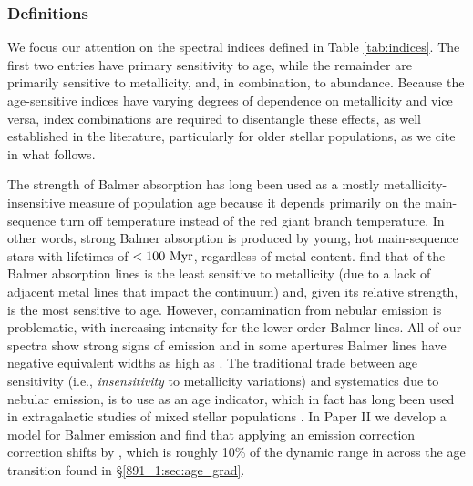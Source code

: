 \subsubsection{Definitions}
\label{891_1:sec:index_defn}

We focus our attention on the spectral indices defined in Table
\ref{tab:indices}. The first two entries have primary sensitivity to
age, while the remainder are primarily sensitive to metallicity, and,
in combination, to abundance. Because the age-sensitive indices have
varying degrees of dependence on metallicity and vice versa, index
combinations are required to disentangle these effects, as well
established in the literature, particularly for older stellar
populations, as we cite in what follows.

The strength of Balmer absorption has long been used as a mostly
metallicity-insensitive measure of population age because it depends
primarily on the main-sequence turn off temperature instead of the red
giant branch temperature. In other words, strong Balmer absorption is
produced by young, hot main-sequence stars with lifetimes of
$<100~\mathrm{Myr} $, regardless of metal content. \citet{Worthey97} find
that of the Balmer absorption lines \HB is the least sensitive to
metallicity (due to a lack of adjacent metal lines that impact the
continuum) and, given its relative strength, is the most sensitive to
age.  However, contamination from nebular emission is problematic,
with increasing intensity for the lower-order Balmer lines.  All of
our spectra show strong signs of \Ha emission and in some apertures
Balmer lines have negative equivalent widths as high as \Hg.  The
traditional trade between age sensitivity (i.e., \emph{insensitivity}
to metallicity variations) and systematics due to nebular emission, is
to use \Hda \citep{Worthey97} as an age indicator, which in fact has
long been used in extragalactic studies of mixed stellar populations
\citep[e.g.,][]{Couch87}. In Paper II we develop a model for Balmer
emission and find that applying an emission correction correction
shifts \Hda by , which is roughly 10\% of the
dynamic range in \Hda across the age transition found in
\S\ref{891_1:sec:age_grad}.

